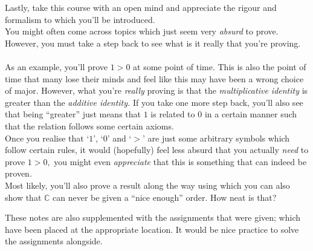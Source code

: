 Lastly, take this course with an open mind and appreciate the rigour and formalism to which you'll be introduced.\\
You might often come across topics which just seem very \emph{absurd} to prove. However, you must take a step back to see what is it really that you're proving.\\\\
As an example, you'll prove $1 > 0$ at some point of time. This is also the point of time that many lose their minds and feel like this may have been a wrong choice of major. However, what you're \emph{really} proving is that the \emph{multiplicative identity} is greater than the \emph{additive identity.} If you take one more step back, you'll also see that being ``greater'' just means that $1$ is related to $0$ in a certain manner such that the relation follows some certain axioms.\\
Once you realise that `$1$', `$0$' and `$>$' are just some arbitrary symbols which follow certain rules, it would (hopefully) feel less absurd that you actually \emph{need} to prove $1 > 0,$ you might even \emph{appreciate} that this is something that can indeed be proven.\\
Most likely, you'll also prove a result along the way using which you can also show that $\mathbb{C}$ can never be given a ``nice enough'' order. How neat is that?

\hrulefill

These notes are also supplemented with the assignments that were given; which have been placed at the appropriate location. It would be nice practice to solve the assignments alongside.
